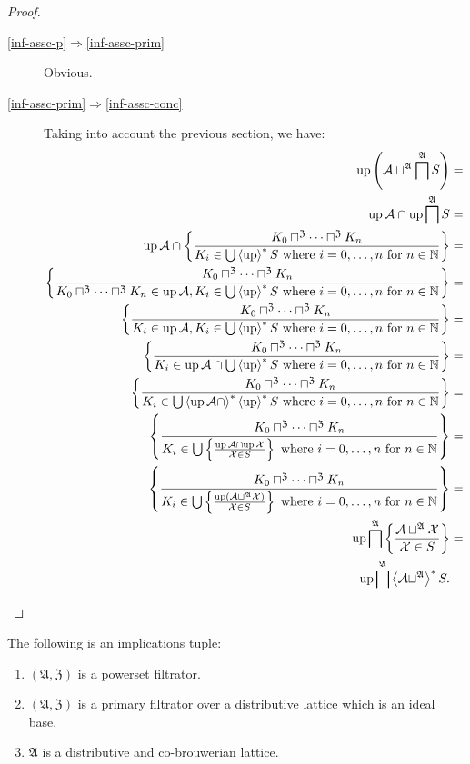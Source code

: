 \begin{proof}
~
\begin{description}
\item [{\ref{inf-assc-p}$\Rightarrow$\ref{inf-assc-prim}}] Obvious.
\item [{\ref{inf-assc-prim}$\Rightarrow$\ref{inf-assc-conc}}] Taking
into account the previous section, we have:
\begin{align*}
\operatorname{up}\left(\mathcal{A}\sqcup^{\mathfrak{A}}\bigsqcap^{\mathfrak{A}}S\right) & =\\
\operatorname{up}\mathcal{A}\cap\operatorname{up}\bigsqcap^{\mathfrak{A}}S & =\\
\operatorname{up}\mathcal{A}\cap\left\{ \frac{K_{0}\sqcap^{\mathfrak{Z}}\dots\sqcap^{\mathfrak{Z}}K_{n}}{K_{i}\in\bigcup\left\langle \operatorname{up}\right\rangle ^{\ast}S\text{ where }i=0,\dots,n\text{ for }n\in\mathbb{N}}\right\} & =\\
\left\{ \frac{K_{0}\sqcap^{\mathfrak{Z}}\dots\sqcap^{\mathfrak{Z}}K_{n}}{K_{0}\sqcap^{\mathfrak{Z}}\dots\sqcap^{\mathfrak{Z}}K_{n}\in\operatorname{up}\mathcal{A},K_{i}\in\bigcup\left\langle \operatorname{up}\right\rangle ^{\ast}S\text{ where }i=0,\dots,n\text{ for }n\in\mathbb{N}}\right\} & =\\
\left\{ \frac{K_{0}\sqcap^{\mathfrak{Z}}\dots\sqcap^{\mathfrak{Z}}K_{n}}{K_{i}\in\operatorname{up}\mathcal{A},K_{i}\in\bigcup\left\langle \operatorname{up}\right\rangle ^{\ast}S\text{ where }i=0,\dots,n\text{ for }n\in\mathbb{N}}\right\} & =\\
\left\{ \frac{K_{0}\sqcap^{\mathfrak{Z}}\dots\sqcap^{\mathfrak{Z}}K_{n}}{K_{i}\in\operatorname{up}\mathcal{A}\cap\bigcup\left\langle \operatorname{up}\right\rangle ^{\ast}S\text{ where }i=0,\dots,n\text{ for }n\in\mathbb{N}}\right\} & =\\
\left\{ \frac{K_{0}\sqcap^{\mathfrak{Z}}\dots\sqcap^{\mathfrak{Z}}K_{n}}{K_{i}\in\bigcup\left\langle \operatorname{up}\mathcal{A}\cap\right\rangle ^{\ast}\left\langle \operatorname{up}\right\rangle ^{\ast}S\text{ where }i=0,\dots,n\text{ for }n\in\mathbb{N}}\right\} & =\\
\left\{ \frac{K_{0}\sqcap^{\mathfrak{Z}}\dots\sqcap^{\mathfrak{Z}}K_{n}}{K_{i}\in\bigcup\left\{ \frac{\operatorname{up}\mathcal{A}\cap\operatorname{up}\mathcal{X}}{\mathcal{X}\in S}\right\}\text{ where }i=0,\dots,n\text{ for }n\in\mathbb{N}}\right\} & =\\
\left\{ \frac{K_{0}\sqcap^{\mathfrak{Z}}\dots\sqcap^{\mathfrak{Z}}K_{n}}{K_{i}\in\bigcup\left\{ \frac{\operatorname{up}(\mathcal{A}\sqcup^{\mathfrak{A}}\mathcal{X})}{\mathcal{X}\in S}\right\}\text{ where }i=0,\dots,n\text{ for }n\in\mathbb{N}}\right\} & =\\
\operatorname{up}\bigsqcap^{\mathfrak{A}}\left\{ \frac{\mathcal{A}\sqcup^{\mathfrak{A}}\mathcal{X}}{\mathcal{X}\in S}\right\} & =\\
\operatorname{up}\bigsqcap^{\mathfrak{A}}\left\langle \mathcal{A}\sqcup^{\mathfrak{A}}\right\rangle ^{\ast}S.
\end{align*}

\end{description}
\end{proof}
\begin{cor}
\label{filt-also-distr}The following is an implications tuple:
\begin{enumerate}
\item $(\mathfrak{A},\mathfrak{Z})$ is a powerset filtrator.
\item $(\mathfrak{A},\mathfrak{Z})$ is a primary filtrator over a distributive
lattice which is an ideal base.
\item $\mathfrak{A}$ is a distributive and co-brouwerian lattice.
\end{enumerate}
\end{cor}

